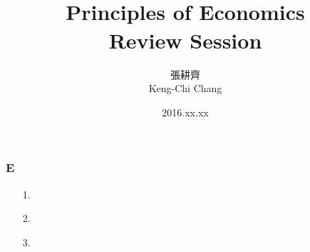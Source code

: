 \documentclass[12pt, xcolor=dvipsnames]{beamer}
\title{\bf{\Huge {}\\[-2mm] Principles of Economics \\[2mm] Review Session}}
\author{{\Large 張耕齊\\[2mm] Keng-Chi Chang}}
\institute{{}\\[-7mm]\footnotesize\tt{<r03323070@ntu.edu.tw>}\\[2mm]}
\date{\large 2016.xx.xx}
\begin{document}
\fontsize{12}{14pt}\selectfont

\begin{frame}
\titlepage
\end{frame}

\begin{frame}
\frametitle{\bf }
\begin{itemize}
\item 
\begin{itemize}
\item 
\end{itemize}
\item 
\end{frame}

\begin{frame}
\frametitle{\bf E}
\small \textsf{\bfseries } 
\begin{enumerate}\itemsep-0.5ex
\item [1.] 
\item [2.] 
\item [3.] 
\end{enumerate}
\end{frame}
\end{document}
